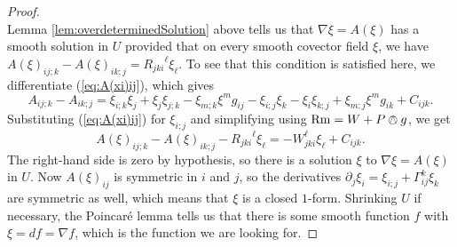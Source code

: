 \documentclass{amsart}
\numberwithin{equation}{section}
\newcommand{\del}{\partial}
\newcommand{\Rm}{\mathrm{Rm}}
\theoremstyle{plain}
\theoremstyle{definition}
\theoremstyle{remark}
\begin{document}
\begin{proof}
\begin{equation}
    \end{equation}
    Lemma \ref{lem:overdeterminedSolution} above tells us that $\nabla \xi = A(\xi)$ has a smooth solution in $U$ provided that on every smooth covector field $\xi$, we have $A(\xi)_{ij;k} - A(\xi)_{ik;j} = {R_{jki}}^\ell \xi_\ell$. To see that this condition is satisfied here, we differentiate (\ref{eq:A(xi)ij}), which gives
    \[A_{ij;k} - A_{ik;j} = \xi_{i;k}\xi_j + \xi_j \xi_{j;k} - \xi_{m;k}\xi^m g_{ij} - \xi_{i;j}\xi_k - \xi_i \xi_{k;j} + \xi_{m;j}\xi^m g_{ik} + C_{ijk}.\]
    Substituting (\ref{eq:A(xi)ij}) for $\xi_{i;j}$ and simplifying using $\Rm = W + P \owedge g$, we get
    \[A(\xi)_{ij;k} - A(\xi)_{ik;j} - {R_{jki}}^\ell \xi_\ell = - W_{jki}^\ell \xi_\ell + C_{ijk}.\] 
    The right-hand side is zero by hypothesis, so there is a solution $\xi$ to $\nabla \xi = A(\xi)$ in $U$. Now $A(\xi)_{ij}$ is symmetric in $i$ and $j$, so the derivatives $\del_j\xi_i = \xi_{i;j} + \Gamma_{ij}^k \xi_k$ are symmetric as well, which means that $\xi$ is a closed $1$-form. Shrinking $U$ if necessary, the Poincar\'e lemma tells us that there is some smooth function $f$ with $\xi = df = \nabla f$, which is the function we are looking for.
\end{proof}
\printbibliography 
\end{document}
